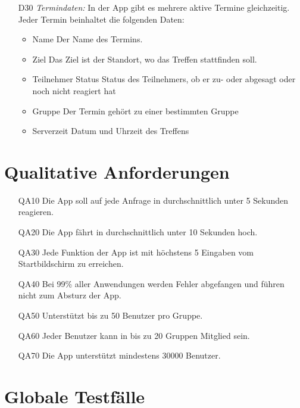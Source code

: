 \documentclass{scrartcl}
\begin{document}
\begin{itemize}
		\item [D30] \textit{Termindaten:}
		In der App gibt es mehrere aktive Termine gleichzeitig. Jeder Termin beinhaltet die folgenden Daten:
		\begin{itemize}
			\item Name
			\newline Der Name des Termins.
			\item Ziel
			\newline Das Ziel ist der Standort, wo das Treffen stattfinden soll.
			\item Teilnehmer Status
			\newline Status des Teilnehmers, ob er zu- oder abgesagt oder noch nicht reagiert hat
			\item Gruppe
			\newline Der Termin gehört zu einer bestimmten Gruppe
			\item Serverzeit
			\newline Datum und Uhrzeit des Treffens
		\end{itemize}
	\end{itemize}
	
	\newpage
	
	
	\section{Qualitative Anforderungen}
	\begin{itemize}
		\item[QA10] Die App soll auf jede Anfrage in durchschnittlich unter 5 Sekunden reagieren.
		\item[QA20] Die App fährt in durchschnittlich unter 10 Sekunden hoch.
		\item[QA30] Jede Funktion der App ist mit höchstens 5 Eingaben vom Startbildschirm zu erreichen.
		\item[QA40] Bei 99\% aller Anwendungen werden Fehler abgefangen und führen nicht zum Absturz der App.
		\item[QA50] Unterstützt bis zu 50 Benutzer pro Gruppe.
		\item[QA60] Jeder Benutzer kann in bis zu 20 Gruppen Mitglied sein.
		\item[QA70] Die App unterstützt mindestens 30000 Benutzer.
	\end{itemize}
	
	\newpage
	
	
	\section{Globale Testfälle}
\end{document}

